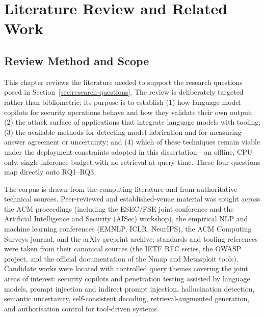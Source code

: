 \chapter{Literature Review and Related Work}\label{ch:literature-review}

\section{Review Method and Scope}\label{sec:review-method-and-scope}

This chapter reviews the literature needed to support the research questions
posed in Section~\ref{sec:research-questions}. The review is deliberately
targeted rather than bibliometric: its purpose is to establish (1) how
language-model copilots for security operations behave and how they validate
their own output; (2) the attack surface of applications that integrate
language models with tooling; (3) the available methods for detecting model
fabrication and for measuring answer agreement or uncertainty; and (4) which of
these techniques remain viable under the deployment constraints adopted in this
dissertation---an offline, CPU-only, single-inference budget with no retrieval
at query time. These four questions map directly onto RQ1--RQ3.

The corpus is drawn from the computing literature and from authoritative
technical sources. Peer-reviewed and established-venue material was sought
across the ACM proceedings (including the ESEC/FSE joint conference and the
Artificial Intelligence and Security (AISec) workshop), the empirical NLP and
machine learning conferences (EMNLP, ICLR, NeurIPS), the ACM Computing Surveys
journal, and the arXiv preprint archive; standards and tooling references were taken
from their canonical sources (the IETF RFC series, the OWASP project, and the
official documentation of the Nmap and Metasploit tools). Candidate works were
located with controlled query themes covering the joint areas of interest:
security copilots and penetration testing assisted by language models, prompt
injection and indirect prompt injection, hallucination detection, semantic
uncertainty, self-consistent decoding, retrieval-augmented generation, and
authorisation control for tool-driven systems.

